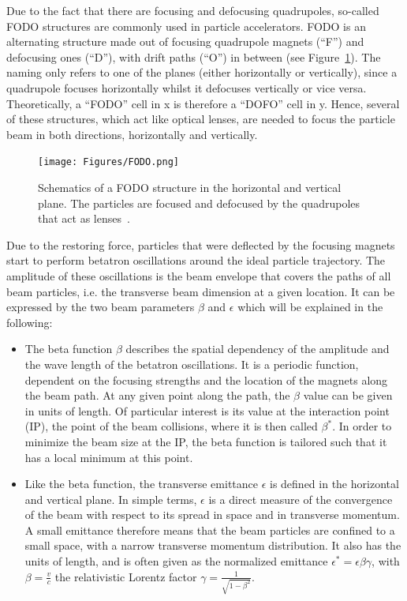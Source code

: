 Due to the fact that there are focusing and defocusing quadrupoles, so-called FODO structures are commonly used in particle accelerators.
FODO is an alternating structure made out of focusing quadrupole magnets (``F'') and defocusing ones (``D''), with drift paths (``O'') in between (see Figure~\ref{fig:FODO}). 
The naming only refers to one of the planes (either horizontally or vertically), since a quadrupole focuses horizontally whilst it defocuses vertically or vice versa.
Theoretically, a ``FODO'' cell in x is therefore a ``DOFO'' cell in y.
Hence, several of these structures, which act like optical lenses, are needed to focus the particle beam in both directions, horizontally and vertically.
\begin{figure}
\centering
\texttt{[image: Figures/FODO.png]}
\caption[Schematic of FODO structure]{Schematics of a FODO structure in the horizontal and vertical plane. The particles are focused and defocused by the quadrupoles that act as lenses~\cite[p. 65]{Hinterberger}.}
\label{fig:FODO}
\end{figure}
Due to the restoring force, particles that were deflected by the focusing magnets start to perform betatron oscillations around the ideal particle trajectory.
The amplitude of these oscillations is the beam envelope that covers the paths of all beam particles, i.e. the transverse beam dimension at a given location.
It can be expressed by the two beam parameters $\beta$ and $\epsilon$ which will be explained in the following:
\begin{itemize}
 \item The beta function $\beta$ describes the spatial dependency of the amplitude and the wave length of the betatron oscillations.
It is a periodic function, dependent on the focusing strengths and the location of the magnets along the beam path.
At any given point along the path, the $\beta$ value can be given in units of length.
Of particular interest is its value at the interaction point (IP), the point of the beam collisions, where it is then called $\beta^*$.
In order to minimize the beam size at the IP, the beta function is tailored such that it has a local minimum at this point.  
\item Like the beta function, the transverse emittance $\epsilon$ is defined in the horizontal and vertical plane.
In simple terms, $\epsilon$ is a direct measure of the convergence of the beam with respect to its spread in space and in transverse momentum.
A small emittance therefore means that the beam particles are confined to a small space, with a narrow transverse momentum distribution.
It also has the units of length, and is often given as the normalized emittance $\epsilon^* = \epsilon\beta\gamma$, with $\beta=\frac{v}{c}$ the relativistic Lorentz factor $\gamma=\frac{1}{\sqrt{1-\beta^2}}$.
\end{itemize}
